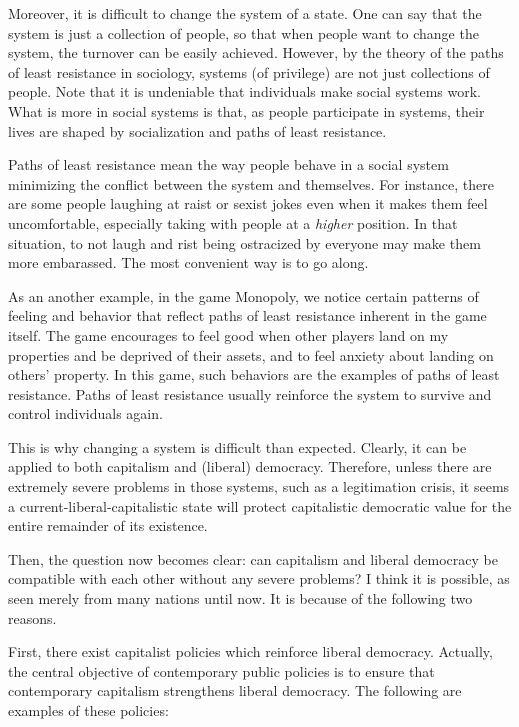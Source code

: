 \documentclass{homework}
\begin{document}
Moreover, it is difficult to change the system of a state. One can say that the system is just a collection of people, so that when people want to change the system, the turnover can be easily achieved. However, by the theory of the paths of least resistance in sociology, systems (of privilege) are not just collections of people. Note that it is undeniable that individuals make social systems work. What is more in social systems is that, as people participate in systems, their lives are shaped by socialization and paths of least resistance. 

Paths of least resistance mean the way people behave in a social system minimizing the conflict between the system and themselves. For instance, there are some people laughing at raist or sexist jokes even when it makes them feel uncomfortable, especially taking with people at a \textit{higher} position. In that situation, to not laugh and rist being ostracized by everyone may make them more embarassed. The most convenient way is to go along.

As an another example, in the game Monopoly, we notice certain patterns of feeling and behavior that reflect paths of least resistance inherent in the game itself. The game encourages to feel good when other players land on my properties and be deprived of their assets, and to feel anxiety about landing on others' property. In this game, such behaviors are the examples of paths of least resistance. Paths of least resistance usually reinforce the system to survive and control individuals again. 

This is why changing a system is difficult than expected. Clearly, it can be applied to both capitalism and (liberal) democracy. Therefore, unless there are extremely severe problems in those systems, such as a legitimation crisis, it seems a current-liberal-capitalistic state will protect capitalistic democratic value for the entire remainder of its existence.

Then, the question now becomes clear: can capitalism and liberal democracy be compatible with each other without any severe problems? I think it is possible, as seen merely from many nations until now. It is because of the following two reasons.

First, there exist capitalist policies which reinforce liberal democracy. Actually, the central objective of contemporary public policies is to ensure that contemporary capitalism strengthens liberal democracy. The following are examples of these policies:
\end{document}
